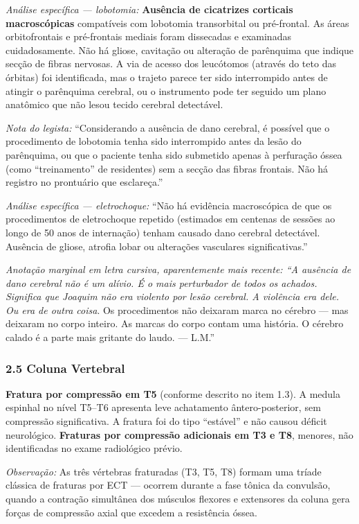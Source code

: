 \noindent \textit{Análise específica --- lobotomia:} \textbf{Ausência de cicatrizes corticais macroscópicas} compatíveis com lobotomia transorbital ou pré-frontal. As áreas orbitofrontais e pré-frontais mediais foram dissecadas e examinadas cuidadosamente. Não há gliose, cavitação ou alteração de parênquima que indique secção de fibras nervosas. A via de acesso dos leucótomos (através do teto das órbitas) foi identificada, mas o trajeto parece ter sido interrompido antes de atingir o parênquima cerebral, ou o instrumento pode ter seguido um plano anatômico que não lesou tecido cerebral detectável.

\noindent \textit{Nota do legista:} ``Considerando a ausência de dano cerebral, é possível que o procedimento de lobotomia tenha sido interrompido antes da lesão do parênquima, ou que o paciente tenha sido submetido apenas à perfuração óssea (como ``treinamento'' de residentes) sem a secção das fibras frontais. Não há registro no prontuário que esclareça.''

\noindent \textit{Análise específica --- eletrochoque:} ``Não há evidência macroscópica de que os procedimentos de eletrochoque repetido (estimados em centenas de sessões ao longo de 50 anos de internação) tenham causado dano cerebral detectável. Ausência de gliose, atrofia lobar ou alterações vasculares significativas.''

\noindent \textit{Anotação marginal em letra cursiva, aparentemente mais recente:\textit{ ``A ausência de dano cerebral não é um alívio. É o mais perturbador de todos os achados. Significa que Joaquim não era violento por lesão cerebral. A violência era }dele\textit{. Ou era de }outra coisa}. Os procedimentos não deixaram marca no cérebro --- mas deixaram no corpo inteiro. As marcas do corpo contam uma história. O cérebro calado é a parte mais gritante do laudo. --- L.M.''

\subsubsection*{2.5 Coluna Vertebral}

\noindent \textbf{Fratura por compressão em T5} (conforme descrito no item 1.3). A medula espinhal no nível T5--T6 apresenta leve achatamento ântero-posterior, sem compressão significativa. A fratura foi do tipo ``estável'' e não causou déficit neurológico. \textbf{Fraturas por compressão adicionais em T3 e T8}, menores, não identificadas no exame radiológico prévio.

\noindent \textit{Observação:} As três vértebras fraturadas (T3, T5, T8) formam uma tríade clássica de fraturas por ECT --- ocorrem durante a fase tônica da convulsão, quando a contração simultânea dos músculos flexores e extensores da coluna gera forças de compressão axial que excedem a resistência óssea.

